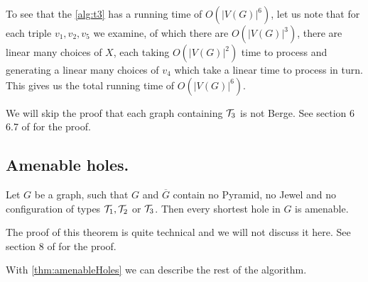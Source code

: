 To see that the \cref{alg:t3} has a running time of $O(|V(G)|^6)$, let us note that for each triple $v_1, v_2, v_5$ we examine, of which there are $O(|V(G)|^3)$, there are linear many choices of $X$, each taking $O(|V(G)|^2)$ time to process and generating a linear many choices of $v_4$ which take a linear time to process in turn. This gives us the total running time of $O(|V(G)|^6)$.

We will skip the proof that each graph containing $\mathcal{T}_3$ is not Berge. See section 6 6.7 of \cite{MC05} for the proof.

\subsection{Amenable holes.}
\label{AmenableHoles}

\begin{theorem}
	\label{thm:amenableHoles}
	Let $G$ be a graph, such that $G$ and $\overline{G}$ contain no Pyramid, no Jewel and no configuration of types $\mathcal{T}_1, \mathcal{T}_2$ or $\mathcal{T}_3$. Then every shortest hole in $G$ is amenable.
\end{theorem}

The proof of this theorem is quite technical and we will not discuss it here. See section 8 of \cite{MC05} for the proof.

With \cref{thm:amenableHoles} we can describe the rest of the algorithm.

